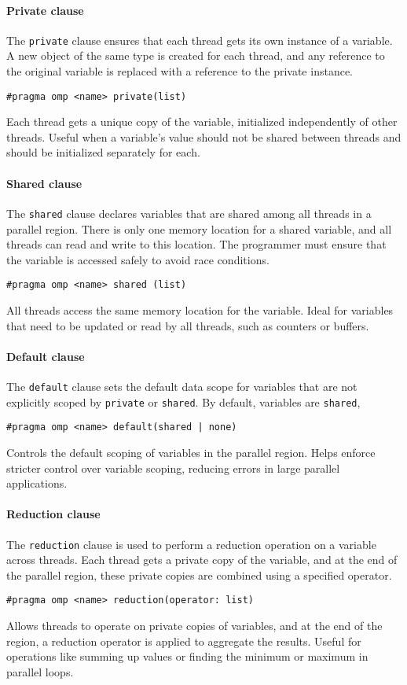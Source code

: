 \paragraph*{Private clause}
The \texttt{private} clause ensures that each thread gets its own instance of a variable.
A new object of the same type is created for each thread, and any reference to the original variable is replaced with a reference to the private instance.
\begin{lstlisting}[style=C]
#pragma omp <name> private(list)
\end{lstlisting}
Each thread gets a unique copy of the variable, initialized independently of other threads.
Useful when a variable's value should not be shared between threads and should be initialized separately for each.

\paragraph*{Shared clause}
The \texttt{shared} clause declares variables that are shared among all threads in a parallel region.
There is only one memory location for a shared variable, and all threads can read and write to this location.
The programmer must ensure that the variable is accessed safely to avoid race conditions. 
\begin{lstlisting}[style=C]
#pragma omp <name> shared (list)
\end{lstlisting}
All threads access the same memory location for the variable.
Ideal for variables that need to be updated or read by all threads, such as counters or buffers.

\paragraph*{Default clause}
The \texttt{default} clause sets the default data scope for variables that are not explicitly scoped by \texttt{private} or \texttt{shared}.
By default, variables are \texttt{shared}, 
\begin{lstlisting}[style=C]
#pragma omp <name> default(shared | none)
\end{lstlisting}
Controls the default scoping of variables in the parallel region.
Helps enforce stricter control over variable scoping, reducing errors in large parallel applications.

\paragraph*{Reduction clause}
The \texttt{reduction} clause is used to perform a reduction operation on a variable across threads. 
Each thread gets a private copy of the variable, and at the end of the parallel region, these private copies are combined using a specified operator.
\begin{lstlisting}[style=C]
#pragma omp <name> reduction(operator: list)
\end{lstlisting}
Allows threads to operate on private copies of variables, and at the end of the region, a reduction operator is applied to aggregate the results.
Useful for operations like summing up values or finding the minimum or maximum in parallel loops.

